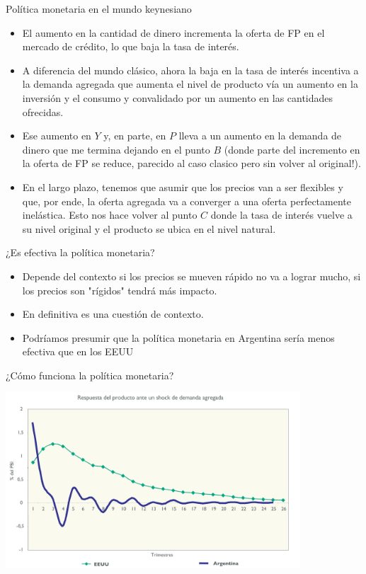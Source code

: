 \documentclass{beamer}
\begin{document}
\begin{frame}{Política monetaria en el mundo keynesiano}

\begin{itemize}
    \item El aumento en la cantidad de dinero incrementa la oferta de FP en el mercado de crédito, lo que baja la tasa de interés. 
    \item A diferencia del mundo clásico, ahora la baja en la tasa de interés incentiva a la demanda agregada que aumenta el nivel de producto vía un aumento en la inversión y el consumo y convalidado por un aumento en las cantidades ofrecidas. 
    \item Ese aumento en $Y$ y, en parte, en $P$ lleva a un aumento en la demanda de dinero que me termina dejando en el punto $B$ (donde parte del incremento en la oferta de FP se reduce, parecido al caso clasico pero sin volver al original!).
    \item En el largo plazo, tenemos que asumir que los precios van a ser flexibles y que, por ende, la oferta agregada va a converger a una oferta perfectamente inelástica. Esto nos hace volver al punto $C$ donde la tasa de interés vuelve a su nivel original y el producto se ubica en el nivel natural.
\end{itemize}
\end{frame}

\begin{frame}{¿Es efectiva la política monetaria?}
    \begin{itemize}
        \item Depende del contexto si los precios se mueven rápido no va a lograr mucho, si los precios son "rígidos" tendrá más impacto. 
        \item En definitiva es una cuestión de contexto.
        \item Podríamos presumir que la política monetaria en Argentina sería menos efectiva que en los EEUU
    \end{itemize}
\end{frame}

\begin{frame}{¿Cómo funciona la política monetaria?}
    
    \centering\includegraphics[width=11cm]{Slides Principios de Economia/P81.png}\

\end{frame}
\end{document}
